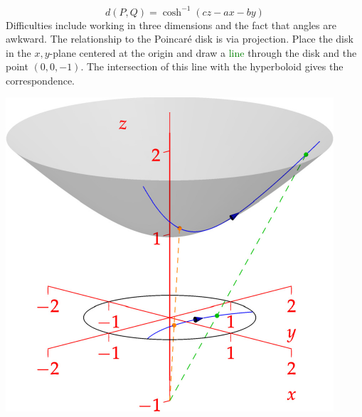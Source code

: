 \begin{minipage}[t]{0.6\linewidth}\vspace{-10pt}
	\[
		d(P,Q)=\cosh^{-1}(cz-ax-by)
	\]
	Difficulties include working in three dimensions and the fact that angles are awkward.\smallbreak
	The relationship to the Poincaré disk is via projection. Place the disk in the $x,y$-plane centered at the origin and draw a \textcolor{Green}{line} through the disk and the point $(0,0,-1)$. The intersection of this line with the hyperboloid gives the correspondence.
\end{minipage}
\hfill
\begin{minipage}[t]{0.39\linewidth}\vspace{0pt}
	\flushright\href{http://www.math.uci.edu/~ndonalds/math161/hyper-plane.html}{\includegraphics[scale=0.8]{hyper-plane}}
\end{minipage}


